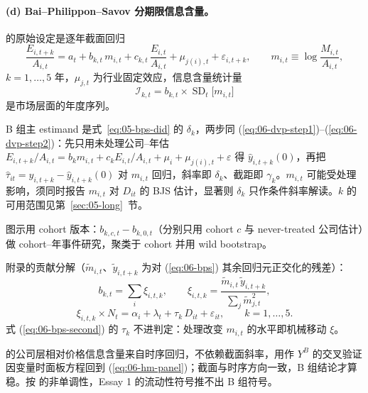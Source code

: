 \documentclass[a4paper,11pt]{ctexart}
\begin{document}
\paragraph{(d) Bai--Philippon--Savov 分期限信息含量。}
\citet{baiphilipponsavov2016} 的原始设定是逐年截面回归
\begin{equation}\label{eq:06-bps}
\frac{E_{i,t+k}}{A_{i,t}}=a_{t}+b_{k,t}\,m_{i,t}+c_{k,t}\,\frac{E_{i,t}}{A_{i,t}}+\mu_{j(i),t}+\varepsilon_{i,t+k},\qquad m_{i,t}\equiv\log\frac{M_{i,t}}{A_{i,t}},
\end{equation}
$k=1,\dots,5$ 年，$\mu_{j,t}$ 为行业固定效应，信息含量统计量
\begin{equation}\label{eq:06-bps-info}
\mathcal{I}_{k,t}=b_{k,t}\times\operatorname{SD}_t\big[m_{i,t}\big]
\end{equation}
是市场层面的年度序列。

B 组主 estimand 是式~\eqref{eq:05-bps-did} 的 $\delta_k$，两步同 (\ref{eq:06-dvp-step1})--(\ref{eq:06-dvp-step2})：先只用未处理公司--年估 $E_{i,t+k}/A_{i,t}=b_k m_{i,t}+c_k E_{i,t}/A_{i,t}+\mu_i+\mu_{j(i),t}+\varepsilon$ 得 $\hat y_{i,t+k}(0)$，再把 $\hat\tau_{it}=y_{i,t+k}-\hat y_{i,t+k}(0)$ 对 $m_{i,t}$ 回归，斜率即 $\delta_k$、截距即 $\gamma_k$。$m_{i,t}$ 可能受处理影响，须同时报告 $m_{i,t}$ 对 $D_{it}$ 的 BJS 估计，显著则 $\delta_k$ 只作条件斜率解读。$k$ 的可用范围见第~\ref{sec:05-long}~节。

图示用 cohort 版本：$b_{k,c,t}-b_{k,0,t}$（分别只用 cohort $c$ 与 never-treated 公司估计）做 cohort--年事件研究，聚类于 cohort 并用 wild bootstrap。

附录的贡献分解（$\tilde m_{i,t}$、$\tilde y_{i,t+k}$ 为对 (\ref{eq:06-bps}) 其余回归元正交化的残差）：
\begin{equation}\label{eq:06-bps-contrib}
b_{k,t}=\sum_{i}\xi_{i,t,k},\qquad
\xi_{i,t,k}=\frac{\tilde m_{i,t}\,\tilde y_{i,t+k}}{\sum_{j}\tilde m_{j,t}^{2}} ,
\end{equation}
\begin{equation}\label{eq:06-bps-second}
\xi_{i,t,k}\times N_t=\alpha_i+\lambda_t+\tau_k\,D_{it}+\varepsilon_{it},\qquad k=1,\dots,5 .
\end{equation}
式 (\ref{eq:06-bps-second}) 的 $\tau_k$ 不进判定：处理改变 $m_{i,t}$ 的水平即机械移动 $\xi$。

\citet{davilaparlatore2026} 的公司层相对价格信息含量来自时序回归，不依赖截面斜率，用作 $Y^{B}$ 的交叉验证因变量时面板方程回到 (\ref{eq:06-hm-panel})；截面与时序方向一致，B 组结论才算稳。按 \citet{davilaparlatore2021} 的非单调性，Essay 1 的流动性符号推不出 B 组符号。
\end{document}
